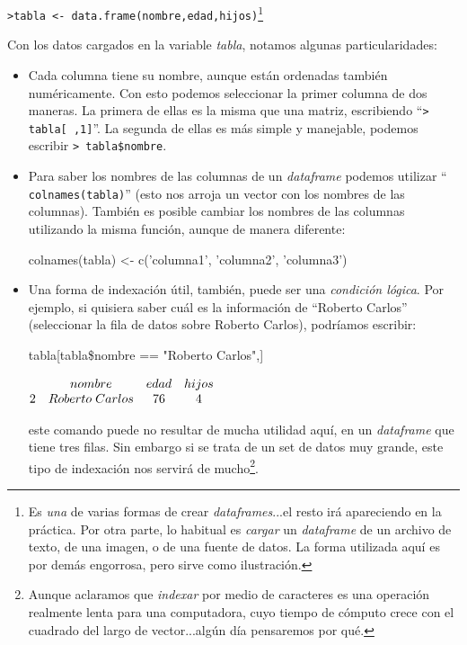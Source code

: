 \documentclass[11pt,a4paper]{article}
\begin{document}
\texttt{>tabla <- data.frame(nombre,edad,hijos)}\footnote{Es \textit{una} de varias formas de crear \textit{dataframes}...el resto irá apareciendo en la práctica. Por otra parte, lo habitual es \textit{cargar} un \textit{dataframe} de un archivo de texto, de una imagen, o de una fuente de datos. La forma utilizada aquí es por demás engorrosa, pero sirve como ilustración.}

Con los datos cargados en la variable \textit{tabla}, notamos algunas particularidades:

\begin{itemize}
\item[$\bullet$] Cada columna tiene su nombre, aunque están ordenadas también numéricamente. Con esto podemos seleccionar la primer columna de dos maneras. La primera de ellas es la misma que una matriz, escribiendo ``\texttt{> tabla[ ,1]}''. La segunda de ellas es más simple y manejable, podemos escribir \texttt{>  tabla\$nombre}.

\item[$\bullet$] Para saber los nombres de las columnas de un \textit{dataframe} podemos utilizar ``\texttt{ colnames(tabla)}'' (esto nos arroja un vector con los nombres de las columnas). También es posible cambiar los nombres de las columnas utilizando la misma función, aunque de manera diferente:
\begin{Schunk}
\begin{Sinput}
colnames(tabla) <- c('columna1', 'columna2', 'columna3')
\end{Sinput}
\end{Schunk}

\item[$\bullet$] Una forma de indexación útil, también, puede ser una \textit{condición lógica}. Por ejemplo, si quisiera saber cuál es la información de ``Roberto Carlos'' (seleccionar la fila de datos sobre Roberto Carlos), podríamos escribir:
\begin{Schunk}
\begin{Sinput}
tabla[tabla\$nombre == "Roberto Carlos",]
\end{Sinput}
\end{Schunk}


$\begin{matrix}

 & nombre & edad & hijos \\
2 & Roberto\hspace{0.1cm} Carlos &  76  &  4

\end{matrix}$

\noindent este comando puede no resultar de mucha utilidad aquí, en un \textit{dataframe} que tiene tres filas. Sin embargo si se trata de un set de datos muy grande, este tipo de indexación nos servirá de mucho\footnote{Aunque aclaramos que \textit{indexar} por medio de caracteres es una operación realmente lenta para una computadora, cuyo tiempo de cómputo crece con el cuadrado del largo de vector...algún día pensaremos por qué.}.
\end{itemize}
\end{document}
